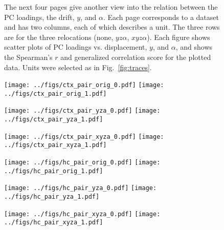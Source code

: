 \documentclass[
  12pt,
]{article}
\theoremstyle{plain}
\theoremstyle{definition}
\theoremstyle{remark}
\newcommand{\1}[1]{\mathbb{1}_{{#1}}}
\begin{document}
\FloatBarrier

\begin{figure}
\caption{The next four pages give another view into the relation between the PC loadings, the drift, $y$, and $\alpha$. Each page corresponds to a dataset and has two columns, each of which describes a unit. The three rows are for the three relocations (none, $yz\alpha$, $xyz\alpha$). Each figure shows scatter plots of PC loadings vs. displacement, $y$, and $\alpha$, and shows the Spearman's $r$ and generalized correlation score for the plotted data. Units were selected as in Fig.~\ref{fig:traces}.}
\label{fig:pairs}
\end{figure}


\begin{figure}[hbtp]
\begin{adjustwidth*}{-1.6in}{-1.6in}
\begin{center}
\texttt{[image: ../figs/ctx\_pair\_orig\_0.pdf]}
\texttt{[image: ../figs/ctx\_pair\_orig\_1.pdf]}

\medskip

\texttt{[image: ../figs/ctx\_pair\_yza\_0.pdf]}
\texttt{[image: ../figs/ctx\_pair\_yza\_1.pdf]}

\medskip

\texttt{[image: ../figs/ctx\_pair\_xyza\_0.pdf]}
\texttt{[image: ../figs/ctx\_pair\_xyza\_1.pdf]}
\end{center}
\end{adjustwidth*}
\end{figure}

\begin{figure}[hbtp]
\begin{adjustwidth*}{-1.6in}{-1.6in}
\begin{center}
\texttt{[image: ../figs/hc\_pair\_orig\_0.pdf]}
\texttt{[image: ../figs/hc\_pair\_orig\_1.pdf]}

\medskip

\texttt{[image: ../figs/hc\_pair\_yza\_0.pdf]}
\texttt{[image: ../figs/hc\_pair\_yza\_1.pdf]}

\medskip

\texttt{[image: ../figs/hc\_pair\_xyza\_0.pdf]}
\texttt{[image: ../figs/hc\_pair\_xyza\_1.pdf]}
\end{center}
\end{adjustwidth*}
\end{figure}
\end{document}
